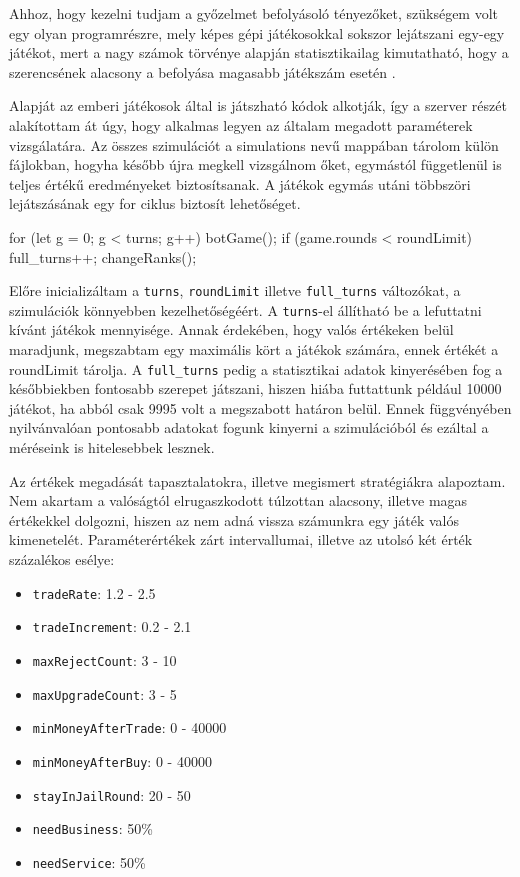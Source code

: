 

Ahhoz, hogy kezelni tudjam a győzelmet befolyásoló tényezőket, szükségem volt egy olyan programrészre, mely képes gépi játékosokkal sokszor lejátszani egy-egy játékot, mert a nagy számok törvénye alapján statisztikailag kimutatható, hogy a szerencsének alacsony a befolyása magasabb játékszám esetén \cite{frayn2005evolutionary}.

Alapját az emberi játékosok által is játszható kódok alkotják, így a szerver részét alakítottam át úgy, hogy alkalmas legyen az általam megadott paraméterek vizsgálatára. Az összes szimulációt a simulations nevű mappában tárolom külön fájlokban, hogyha később újra megkell vizsgálnom őket, egymástól függetlenül is teljes értékű eredményeket biztosítsanak.  A játékok egymás utáni többszöri lejátszásának egy for ciklus biztosít lehetőséget.

\begin{javascript}
for (let g = 0; g < turns; g++){
  botGame();
  if (game.rounds < roundLimit) {
    full_turns++;
    changeRanks();
  }
}
\end{javascript}

Előre inicializáltam a \texttt{turns}, \texttt{roundLimit} illetve \texttt{full\_turns} változókat, a szimulációk könnyebben kezelhetőségéért. A \texttt{turns}-el állítható be a lefuttatni kívánt játékok mennyisége. Annak érdekében, hogy valós értékeken belül maradjunk, megszabtam  egy maximális kört a játékok számára, ennek értékét a roundLimit tárolja. A \texttt{full\_turns} pedig a statisztikai adatok kinyerésében fog a későbbiekben fontosabb szerepet játszani, hiszen hiába futtattunk például 10000 játékot, ha abból csak 9995 volt a megszabott határon belül. Ennek függvényében nyilvánvalóan pontosabb adatokat fogunk kinyerni a szimulációból és ezáltal a méréseink is hitelesebbek lesznek.



Az értékek megadását tapasztalatokra, illetve megismert stratégiákra alapoztam. Nem akartam a valóságtól elrugaszkodott túlzottan alacsony, illetve magas értékekkel dolgozni, hiszen az nem adná vissza számunkra egy játék valós kimenetelét. Paraméterértékek zárt intervallumai, illetve az utolsó két érték százalékos esélye:
\begin{itemize}
	\item \texttt{tradeRate}: 1.2 - 2.5
	\item \texttt{tradeIncrement}: 0.2 - 2.1
	\item \texttt{maxRejectCount}: 3 - 10
	\item \texttt{maxUpgradeCount}: 3 - 5
	\item \texttt{minMoneyAfterTrade}: 0 - 40000
	\item \texttt{minMoneyAfterBuy}: 0 - 40000
	\item \texttt{stayInJailRound}: 20 - 50
	\item \texttt{needBusiness}: 50\%
	\item \texttt{needService}: 50\%
\end{itemize}

